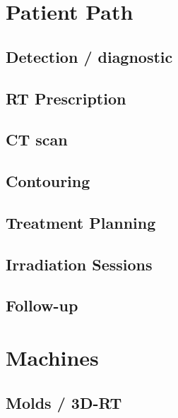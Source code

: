 


\section{Patient Path}

\subsection{Detection / diagnostic}
\subsection{RT Prescription}
\subsection{CT scan}
\subsection{Contouring}
\subsection{Treatment Planning}
\subsection{Irradiation Sessions}
\subsection{Follow-up}

\section{Machines}
\subsection{Molds / 3D-RT}

